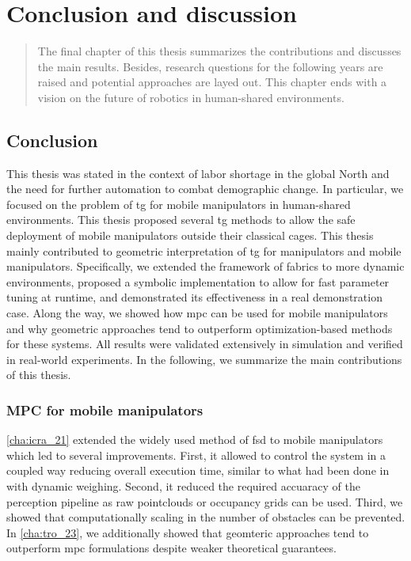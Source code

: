\chapter{Conclusion and discussion}
\label{cha:conclusion}

\begin{abstract}
The final chapter of this thesis summarizes the contributions and discusses the
main results. Besides, research questions for the following years are raised and
potential approaches are layed out. This chapter ends with a vision on the
future of robotics in human-shared environments.
\end{abstract}

\newpage

\section{Conclusion}
\label{sec:conclusion}

This thesis was stated in the context of labor shortage in the global North and
the need for further automation to combat demographic change. In particular, we
focused on the problem of \ac{tg} for mobile manipulators in human-shared
environments. This thesis proposed several \ac{tg} methods to allow the safe
deployment of mobile manipulators outside their classical cages.
This thesis mainly contributed to geometric interpretation of \ac{tg} for
manipulators and mobile manipulators. Specifically, we extended the framework of
\ac{fabrics} to more dynamic environments, proposed a symbolic implementation to
allow for fast parameter tuning at runtime, and demonstrated its effectiveness
in a real demonstration case. Along the way, we showed how \ac{mpc} can be used
for mobile manipulators and why geometric approaches tend to outperform
optimization-based methods for these systems. All results were validated
extensively in simulation and verified in real-world experiments. In the
following, we summarize the main contributions of this thesis.

\subsection{MPC for mobile manipulators}
\label{sec:conclusion_mpc}

\cref{cha:icra_21} extended the widely used method of \ac{fsd} to mobile
manipulators which led to several improvements. First, it allowed to control
the system in a coupled way reducing overall execution time, similar to what had
been done in \cite{Avanzini2018} with dynamic weighing. Second, it reduced the
required accuaracy of the perception pipeline as raw pointclouds or occupancy
grids can be used. Third, we showed that computationally scaling in the number
of obstacles can be prevented. In \cref{cha:tro_23},
we additionally showed that geomteric approaches tend to outperform \ac{mpc}
formulations despite weaker theoretical guarantees.


